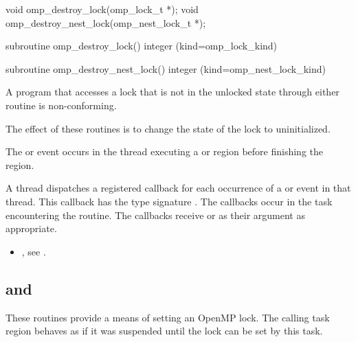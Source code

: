 \format
\begin{ccppspecific}
\begin{ompcFunction}
void omp_destroy_lock(omp_lock_t *);
void omp_destroy_nest_lock(omp_nest_lock_t *);
\end{ompcFunction}
\end{ccppspecific}

\begin{fortranspecific}
\begin{ompfSubroutine}
subroutine omp_destroy_lock()
integer (kind=omp_lock_kind) 

subroutine omp_destroy_nest_lock()
integer (kind=omp_nest_lock_kind) 
\end{ompfSubroutine}
\end{fortranspecific}

\constraints
A program that accesses a lock that is not in the unlocked state through either routine is
non-conforming.

\effect
The effect of these routines is to change the state of the lock to uninitialized.

\events

The  or  event occurs in the thread
executing a  or  region
before finishing the region.

\tools

A thread dispatches a registered 
callback for each occurrence of a  or  event
in that thread.  This callback has the type signature .
The callbacks occur in the task encountering the routine.
The callbacks receive  or
  as their  argument as appropriate.


\crossreferences
\begin{itemize}
\item {}, see
.
\end{itemize}









\subsection{ and }
\label{subsec:omp_set_lock and omp_set_nest_lock}
\summary
These routines provide a means of setting an OpenMP lock. The calling
task region behaves as if it was suspended until the lock can be set
by this task.

